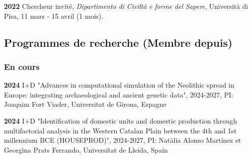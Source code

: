 \documentclass{article}
\newcommand{\fr}[1]{#1}       %
\newcommand{\en}[1]{}     %
\begin{document}
\textbf{2022}
\fr{Chercheur invité, \textit{Dipartimento di Civiltà e forme del Sapere}, Università di Pisa, 11 mars - 15 avril (1 mois).}
\en{Visiting Researcher, \textit{Department of Civilisations and Forms of Knowledge}, University of Pisa, March 11 - April 15 (1 month).}

\smallbreak

\subsection*{\fr{Programmes de recherche (Membre depuis)}\en{Research Programs (Member since)}}
\subsubsection*{\fr{En cours}\en{Research Programs (Ongoing)}}

\textbf{2024 }
\fr{I+D "Advances in computational simulation of the Neolithic spread in Europe: integrating archaeological and ancient genetic data", 2024-2027, PI: Joaquim Fort Viader, Universitat de Girona, Espagne}
\en{I+D "Advances in computational simulation of the Neolithic spread in Europe: integrating archaeological and ancient genetic data", 2024-2027, PI: Joaquim Fort Viader, University of Girona, Spain}

\textbf{2024 }
\fr{I+D "Identification of domestic units and domestic production through multifactorial analysis in the Western Catalan Plain between the 4th and 1st millennium BCE (HOUSEPROD)", 2024-2027, PI: Natàlia Alonso Martínez et Georgina Prats Ferrando, Universitat de Lleida, Spain}
\en{I+D "Identification of domestic units and domestic production through multifactorial analysis in the Western Catalan Plain between the 4th and 1st millennium BCE (HOUSEPROD)", 2024-2027, PI: Natàlia Alonso Martínez and Georgina Prats Ferrando, University of Lleida, Spain}
\end{document}
